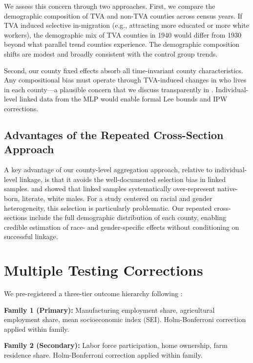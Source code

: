 \documentclass[12pt]{article}
\begin{document}
We assess this concern through two approaches. First, we compare the demographic composition of TVA and non-TVA counties across census years. If TVA induced selective in-migration (e.g., attracting more educated or more white workers), the demographic mix of TVA counties in 1940 would differ from 1930 beyond what parallel trend counties experience. The demographic composition shifts are modest and broadly consistent with the control group trends.

Second, our county fixed effects absorb all time-invariant county characteristics. Any compositional bias must operate through TVA-induced changes in who lives in each county---a plausible concern that we discuss transparently in . Individual-level linked data from the MLP would enable formal Lee bounds and IPW corrections.

\subsection{Advantages of the Repeated Cross-Section Approach}

A key advantage of our county-level aggregation approach, relative to individual-level linkage, is that it avoids the well-documented selection bias in linked samples. \citet{abramitzky2021} and \citet{bailey2020} showed that linked samples systematically over-represent native-born, literate, white males. For a study centered on racial and gender heterogeneity, this selection is particularly problematic. Our repeated cross-sections include the full demographic distribution of each county, enabling credible estimation of race- and gender-specific effects without conditioning on successful linkage.


\section{Multiple Testing Corrections}\label{app:testing}

We pre-registered a three-tier outcome hierarchy following \citet{anderson2008}:

\textbf{Family 1 (Primary):} Manufacturing employment share, agricultural employment share, mean socioeconomic index (SEI). Holm-Bonferroni correction applied within family.

\textbf{Family 2 (Secondary):} Labor force participation, home ownership, farm residence share. Holm-Bonferroni correction applied within family.
\end{document}
